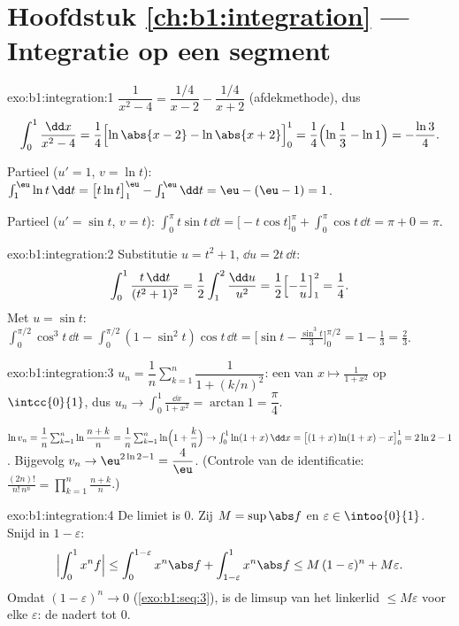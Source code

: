 \section*{Hoofdstuk \ref{ch:b1:integration} --- Integratie op een segment}

\begin{solution}{exo:b1:integration:1}
$\dfrac{1}{x^2-4} = \dfrac{1/4}{x - 2} - \dfrac{1/4}{x+2}$
(afdekmethode), dus
\[
\int_0^1 \frac{\dd x}{x^2 - 4}
= \frac14\Bigl[\ln\abs{x-2} - \ln\abs{x+2}\Bigr]_0^1
= \frac14\Bigl(\ln\frac{1}{3} - \ln 1\Bigr) = -\frac{\ln 3}{4}.
\]

Partieel ($u' = 1$, $v = \ln t$): $\int_1^{\eu} \ln t\,\dd t =
\bigl[t\ln t\bigr]_1^{\eu} - \int_1^{\eu} \dd t = \eu - (\eu - 1) =
1$.

Partieel ($u' = \sin t$, $v = t$): $\int_0^\pi t\sin t\,\dd t =
\bigl[-t\cos t\bigr]_0^\pi + \int_0^\pi \cos t\,\dd t = \pi + 0 =
\pi$.
\end{solution}

\begin{solution}{exo:b1:integration:2}
Substitutie $u = t^2 + 1$, $\dd u = 2t\,\dd t$:
\[
\int_0^1 \frac{t\,\dd t}{(t^2+1)^2}
= \frac12 \int_1^2 \frac{\dd u}{u^2}
= \frac12\Bigl[-\frac1u\Bigr]_1^2 = \frac14 .
\]
Met $u = \sin t$: $\int_0^{\pi/2} \cos^3 t\,\dd t = \int_0^{\pi/2}
(1 - \sin^2 t)\cos t\,\dd t = \bigl[\sin t - \frac{\sin^3
t}{3}\bigr]_0^{\pi/2} = 1 - \frac13 = \frac23$.
\end{solution}

\begin{solution}{exo:b1:integration:3}
$u_n = \dfrac1n \sum_{k=1}^{n} \dfrac{1}{1 + (k/n)^2}$: een
 van $x \mapsto \frac{1}{1+x^2}$ op $\intcc{0}{1}$, dus
$u_n \to \int_0^1 \frac{\dd x}{1+x^2} = \arctan 1 = \dfrac\pi4$.

$\ln v_n = \dfrac1n \sum_{k=1}^{n} \ln\dfrac{n+k}{n} = \dfrac 1n
\sum_{k=1}^n \ln\Bigl(1 + \dfrac kn\Bigr) \to \int_0^1 \ln(1+x)\,\dd
x = \bigl[(1+x)\ln(1+x) - x\bigr]_0^1 = 2\ln 2 - 1$. Bijgevolg $v_n
\to \eu^{2\ln 2 - 1} = \dfrac 4\eu$. (Controle van de
identificatie: $\frac{(2n)!}{n!\,n^n} = \prod_{k=1}^{n}
\frac{n+k}{n}$.)
\end{solution}

\begin{solution}{exo:b1:integration:4}
De limiet is $0$. Zij $M = \sup \abs f$ en $\varepsilon \in
\intoo{0}{1}$. Snijd in $1 - \varepsilon$:
\[
\Bigl| \int_0^1 x^n f \Bigr|
\leq \int_0^{1 - \varepsilon} x^n \abs f + \int_{1-\varepsilon}^1
x^n \abs f
\leq M\,(1-\varepsilon)^n + M\varepsilon .
\]
Omdat $(1 - \varepsilon)^n \to 0$ (\cref{exo:b1:seq:3}), is de
limsup van het linkerlid $\leq M\varepsilon$ voor elke
$\varepsilon$: de  nadert tot $0$.
\end{solution}

